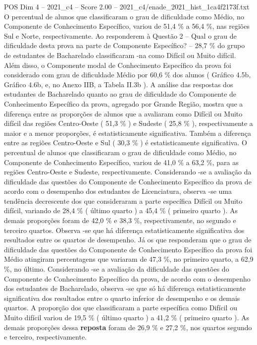 \begin{textsample}{POS Dim 4 – 2021\_c4 – Score 2.00 – 2021\_c4/enade\_2021\_hist\_1ca4f2173f.txt}
O percentual de alunos que classificaram o grau de dificuldade como Médio, no Componente de Conhecimento Específico, variou de 51,4 \% a 56,4 \%, nas regiões Sul e Norte, respectivamente.
Ao responderem à Questão 2 – Qual o grau de dificuldade desta prova na parte de Componente Específico? – 28,7 \% do grupo de estudantes de Bacharelado classificaram -na como Difícil ou Muito difícil.
Além disso, o Componente modal de Conhecimento Específico da prova foi considerado com grau de dificuldade Médio por 60,6 \% dos alunos ( Gráfico 4.5b, Gráfico 4.6b, e, no Anexo IIB, a Tabela II.3b ).
A análise das respostas dos estudantes de Bacharelado quanto ao grau de dificuldade do Componente de Conhecimento Específico da prova, agregado por Grande Região, mostra que a diferença entre as proporções de alunos que a avaliaram como Difícil ou Muito difícil das regiões Centro-Oeste ( 51,3 \% ) e Sudeste ( 25,8 \% ), respectivamente a maior e a menor proporções, é estatisticamente significativa.
Também a diferença entre as regiões Centro-Oeste e Sul ( 30,3 \% ) é estatisticamente significativa.
O percentual de alunos que classificaram o grau de dificuldade como Médio, no Componente de Conhecimento Específico, variou de 41,0 \% a 63,2 \%, para as regiões Centro-Oeste e Sudeste, respectivamente.
Considerando -se a avaliação da dificuldade das questões do Componente de Conhecimento Específico da prova de acordo com o desempenho dos estudantes de Licenciatura, observa -se uma tendência decrescente dos que consideraram a parte específica Difícil ou Muito difícil, variando de 28,4 \% ( último quarto ) a 45,4 \% ( primeiro quarto ).
As demais proporções foram de 42,0 \% e 38,3 \%, respectivamente, no segundo e terceiro quartos.
Observa -se que há diferença estatisticamente significativa dos resultados entre os quartos de desempenho.
Já os que responderam que o grau de dificuldade das questões do Componente de Conhecimento Específico da prova foi Médio atingiram percentagens que variaram de 47,3 \%, no primeiro quarto, a 62,9 \%, no último.
Considerando -se a avaliação da dificuldade das questões do Componente de Conhecimento Específico da prova, de acordo com o desempenho dos estudantes de Bacharelado, observa -se que só há diferença estatisticamente significativa dos resultados entre o quarto inferior de desempenho e os demais quartos.
A proporção dos que classificaram a parte específica como Difícil ou Muito difícil variou de 19,5 \% ( último quarto ) a 41,2 \% ( primeiro quarto ).
As demais proporções dessa \textbf{reposta} foram de 26,9 \% e 27,2 \%, nos quartos segundo e terceiro, respectivamente.

\end{textsample}
